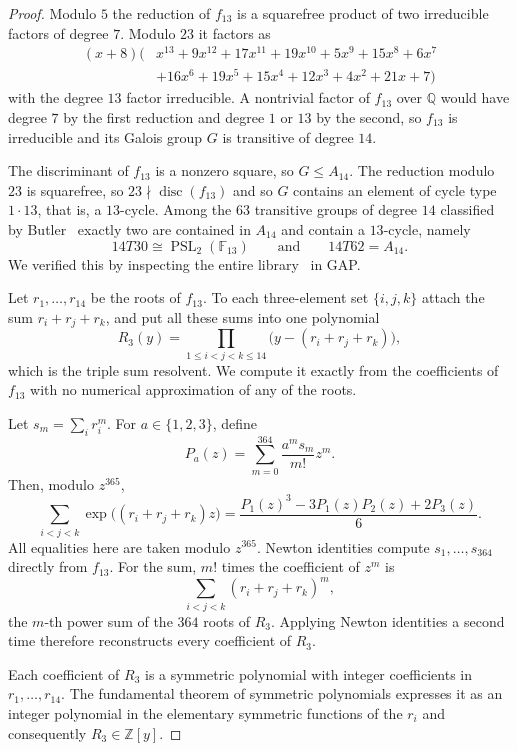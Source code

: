 \documentclass[10pt]{amsart}
\numberwithin{equation}{section}
\newcommand{\Disc}{\operatorname{disc}}
\theoremstyle{definition}
\theoremstyle{remark}
\newcommand{\F}{\mathbb{F}}
\newcommand{\Q}{\mathbb{Q}}
\newcommand{\Z}{\mathbb{Z}}
\newcommand{\PSL}{\operatorname{PSL}}
\begin{document}
\begin{proof}



Modulo $5$ the reduction of $f_{13}$ is a squarefree product of two
irreducible factors of degree $7$.  Modulo $23$ it factors as
\[
\begin{split}
 (x+8)(&x^{13}+9x^{12}+17x^{11}+19x^{10}+5x^9+15x^8+6x^7\\
 &+16x^6+19x^5+15x^4+12x^3+4x^2+21x+7)
\end{split}
\]
with the degree $13$ factor irreducible.  A nontrivial factor of $f_{13}$ over $\Q$ would have degree $7$ by the first reduction and degree $1$ or
$13$ by the second, so $f_{13}$ is irreducible and its Galois group $G$ is
transitive of degree $14$.

The discriminant of $f_{13}$ is a nonzero square, so $G\leq A_{14}$.  The
reduction modulo $23$ is squarefree, so $23\nmid\Disc(f_{13})$ and
so $G$ contains an element of cycle type
$1\cdot13$, that is, a $13$-cycle.  Among the $63$ transitive groups of
degree $14$ classified by Butler~\cite{Butler1993} exactly two are contained
in $A_{14}$ and contain a $13$-cycle, namely
\[
 14T30\cong\PSL_2(\F_{13})
 \qquad\text{and}\qquad
 14T62=A_{14} .
\]
We verified this by inspecting the entire library~\cite{TransGrp} in GAP.

Let $r_1,\ldots,r_{14}$ be the roots of $f_{13}$.  To each three-element set
$\{i,j,k\}$ attach the sum $r_i+r_j+r_k$, and put all these sums into one
polynomial
\[
 R_3(y)=\prod_{1\leq i<j<k\leq14}
       \bigl(y-(r_i+r_j+r_k)\bigr),
\]
which is the triple sum resolvent. We compute it exactly from the coefficients of $f_{13}$ with no numerical
approximation of any of the roots.

 Let $s_m=\sum_i r_i^m$. For $a\in\{1,2,3\}$, define
  \[
   P_a(z)=\sum_{m=0}^{364}\frac{a^ms_m}{m!}z^m.
  \]
  Then, modulo $z^{365}$,
  \[
   \sum_{i<j<k}\exp\bigl((r_i+r_j+r_k)z\bigr)
   =\frac{P_1(z)^3-3P_1(z)P_2(z)+2P_3(z)}6.
  \]
All equalities here are taken modulo $z^{365}$.  Newton identities compute
$s_1,\ldots,s_{364}$ directly from $f_{13}$.  For the sum,  $m!$ times the
coefficient of $z^m$ is
\[
 \sum_{i<j<k}(r_i+r_j+r_k)^m,
\]
the $m$-th power sum of the $364$ roots of $R_3$.  Applying Newton identities
a second time therefore reconstructs every coefficient of $R_3$.

 Each
coefficient of $R_3$ is a symmetric polynomial with integer coefficients in $r_1,\ldots,r_{14}$.  The fundamental theorem of symmetric polynomials
expresses it as an integer polynomial in the elementary symmetric functions
of the $r_i$ and consequently $R_3\in\Z[y]$.


\end{proof}
\end{document}

